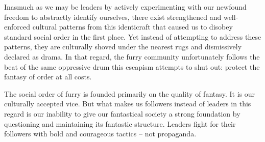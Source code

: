 Inasmuch as we may be leaders by actively experimenting with our newfound freedom to abstractly identify ourselves, there exist strengthened and well-enforced cultural patterns from this identicraft that caused us to disobey standard social order in the first place. Yet instead of attempting to address these patterns, they are culturally shoved under the nearest rugs and dismissively declared as drama. In that regard, the furry community unfortunately follows the beat of the same oppressive drum this escapism attempts to shut out: protect the fantasy of order at all costs.

The social order of furry is founded primarily on the quality of fantasy. It is our culturally accepted vice. But what makes us followers instead of leaders in this regard is our inability to give our fantastical society a strong foundation by questioning and maintaining its fantastic structure. Leaders fight for their followers with bold and courageous tactics -- not propaganda.

